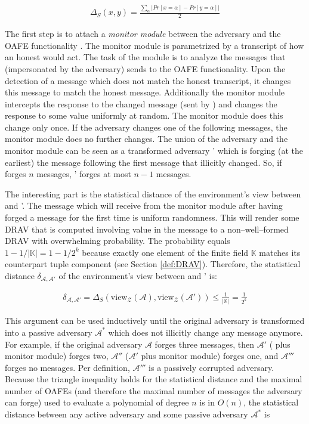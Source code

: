 \begin{align*}
  \Delta_S(x,y) = \frac{\sum_\alpha \left|Pr[x=\alpha] - Pr[y=\alpha]\right|}{2}
\end{align*}

\noindent{}The first step is to attach a \emph{monitor module} between the
adversary \JWadv{} and the OAFE functionality \JWfuncSymOAFE{}. The monitor
module is parametrized by a transcript of how an honest \JWpTwo{} would act. The
task of the module is to analyze the messages that \JWpTwo{} (impersonated by
the adversary) sends to the OAFE functionality. Upon the detection of a message
which does not match the honest transcript, it changes this message to match the
honest message. Additionally the monitor module intercepts the response to
the changed message (sent by \JWfuncSymOAFE{}) and changes the response to some
value uniformly at random. The monitor module does this change only once. If the
adversary changes one of the following messages, the monitor module does no
further changes. The union of the adversary \JWadv{} and the
monitor module can be seen as a transformed adversary \JWadv{}' which is forging
(at the earliest) the message following the first message that \JWadv{}
illicitly changed. So, if \JWadv{} forges $n$ messages, \JWadv{}' forges at
most $n-1$ messages.

The interesting part is the statistical distance of the environment's view
between \JWadv{} and \JWadv{}'. The message which \JWadv{} will receive from the
monitor module after having forged a message for the first time is uniform
randomness.  This will render some DRAV that is computed involving value in the
message to a non--well--formed DRAV with overwhelming probability. The
probability equals $1-1/|\mathbb{K}| = 1-1/2^k$ because exactly one element of
the finite field $\mathbb{K}$ matches its counterpart tuple component (see
Section \ref{def:DRAV}). Therefore, the statistical distance
$\delta_{\mathcal{A},\mathcal{A}'}$ of the environment's view between \JWadv{}
and \JWadv{}' is:

\begin{align*}
  \delta_{\mathcal{A},\mathcal{A}'} =
  \Delta_S(\text{view}_\mathcal{Z}(\mathcal{A}),
  \text{view}_\mathcal{Z}(\mathcal{A}'))
  \leq \frac{1}{|\mathbb{K}|}
  = \frac{1}{2^k}
\end{align*}

\noindent{}This argument can be used inductively until the original adversary
\JWadv{} is transformed into a passive adversary $\mathcal{A}^*$ which does not
illicitly change any message anymore. For example, if the original adversary
$\mathcal{A}$ forges three messages, then $\mathcal{A}'$ (\JWadv{} plus monitor
module) forges two, $\mathcal{A}''$ ($\mathcal{A}'$ plus monitor module) forges
one, and $\mathcal{A}'''$ forges no messages. Per definition, $\mathcal{A}'''$
is a passively corrupted adversary. Because the triangle inequality holds for
the statistical distance and the maximal number of OAFEs (and therefore the
maximal number of messages the adversary can forge) used to evaluate a
polynomial of degree $n$ is in $O(n)$,  the statistical distance between any
active adversary \JWadv{} and some passive adversary $\mathcal{A}^*$ is

